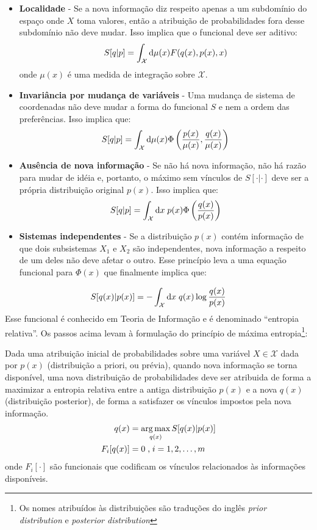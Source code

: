 \begin{itemize}
\item{\bf Localidade} - 
    Se a nova informação diz respeito apenas a um subdomínio do espaço onde $X$ toma valores, então a atribuição de probabilidades fora desse subdomínio não deve mudar. Isso implica que o funcional deve ser aditivo:
    \[
     S[q | p] = \int_{\mathcal{X}} \mathrm{d}\mu(x) F(q(x), p(x), x)
    \]
    onde $\mu(x)$ é uma medida de integração sobre $\mathcal{X}$. 
\item{\bf Invariância por mudança de variáveis} - 
    Uma mudança de sistema de coordenadas não deve mudar a forma do funcional $S$ e nem a ordem das preferências. Isso implica que:
    \[
     S[q | p] = \int_{\mathcal{X}} \mathrm{d}\mu(x) \Phi\left(\frac{p(x)}{\mu(x)},\frac{q(x)}{\mu(x)}\right)
    \]
\item{\bf Ausência de nova informação} - 
    Se não há nova informação, não há razão para mudar de idéia e, portanto, o máximo sem vínculos de $S[\cdot|\cdot]$ deve ser a própria distribuição original $p(x)$. Isso implica que:
    \[
     S[q | p] = \int_{\mathcal{X}} \mathrm{d} x\; p(x) \Phi\left(\frac{q(x)}{p(x)}\right) 
    \]
\item{\bf Sistemas independentes} - 
    Se a distribuição $p(x)$ contém informação de que dois subsistemas $X_1$ e $X_2$ são independentes, nova informação a respeito de um deles não deve afetar o outro. Esse princípio leva a uma equação funcional para $\Phi(x)$ que finalmente implica que:
\end{itemize}
\begin{equation}
\label{eq:relel}
S[q(x) | p(x)] =  - \int_{\mathcal{X}} \ud x\; q(x) \log\frac{q(x)}{p(x)}
\end{equation}
Esse funcional é conhecido em Teoria de Informação\cite{Cover2006} e é denominado ``entropia relativa''. Os passos acima levam à formulação do princípio de máxima entropia\footnote{Os nomes atribuídos às distribuições são traduções do inglês \textit{prior distribution} e {\it posterior distribution}}:
\begin{Principio}
  Dada uma atribuição inicial de probabilidades sobre uma variável $X \in \mathcal{X}$ dada por $p(x)$ (distribuição a priori, ou prévia), quando nova informação se torna disponível, uma nova distribuição de probabilidades deve ser atribuida de forma a maximizar a entropia relativa entre a antiga distribuição $p(x)$  e a nova $q(x)$ (distribuição  posterior), de forma a satisfazer os vínculos impostos pela nova informação.
  \begin{align}
    q(x) &= \operatorname*{arg\,max}_{q(x)} S[q(x)|p(x)] \\
    F_i[q(x)] &= 0 \;\text{,}\;i = 1,2,\ldots,m
  \end{align}
  onde $F_i[\cdot]$ são funcionais que codificam os vínculos relacionados às informações disponíveis.
\end{Principio}
